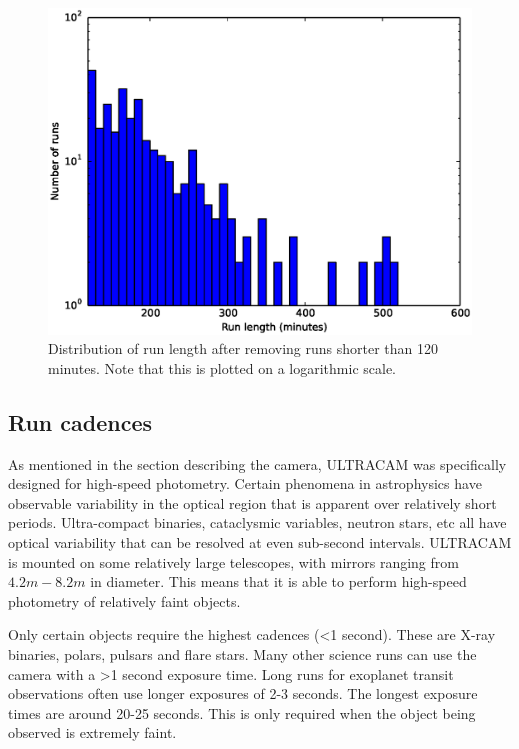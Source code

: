 \begin{figure}[!h]
  \centering
  \includegraphics[width=120mm]{images/hist120-600_log.eps}
  \caption{Distribution of run length after removing runs shorter than 120 minutes. Note that this is plotted on a logarithmic scale.}
  \label{fig:histogram120-600}
\end{figure}

\subsection{Run cadences}
As mentioned in the section describing the camera, ULTRACAM was specifically designed for high-speed photometry. Certain phenomena in astrophysics have observable variability in the optical region that is apparent over relatively short periods. Ultra-compact binaries, cataclysmic variables, neutron stars, etc all have optical variability that can be resolved at even sub-second intervals. ULTRACAM is mounted on some relatively large telescopes, with mirrors ranging from $4.2m - 8.2m$ in diameter. This means that it is able to perform high-speed photometry of relatively faint objects. 

Only certain objects require the highest cadences (\textless 1 second). These are X-ray binaries, polars, pulsars and flare stars. Many other science runs can use the camera with a \textgreater 1 second exposure time. Long runs for exoplanet transit observations often use longer exposures of 2-3 seconds. The longest exposure times are around 20-25 seconds. This is only required when the object being observed is extremely faint.  

